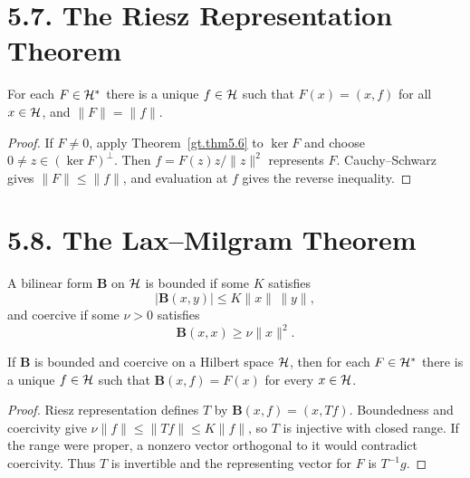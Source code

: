 \section*{5.7. The Riesz Representation Theorem}

\begin{theorem}\label{gt.thm5.7}

For each $F\in\mathcal{H}^*$ there is a unique $f\in\mathcal{H}$ such that
$F(x)=(x,f)$ for all $x\in\mathcal{H}$, and $\|F\|=\|f\|$.
\end{theorem}
\begin{proof}

\sketch If $F\neq0$, apply Theorem~\ref{gt.thm5.6} to $\ker F$ and choose
$0\neq z\in(\ker F)^\perp$. Then
$f=F(z)z/\|z\|^2$ represents $F$. Cauchy--Schwarz gives
$\|F\|\leq\|f\|$, and evaluation at $f$ gives the reverse inequality.
\end{proof}

\section*{5.8. The Lax--Milgram Theorem}

\begin{definition}\label{gt.def5.8.bilinear}

A bilinear form $\mathbf B$ on $\mathcal{H}$ is bounded if some $K$ satisfies
\begin{equation}\label{gt.eq5.10}
|\mathbf B(x,y)|\leq K\|x\|\,\|y\|,
\end{equation}
and coercive if some $\nu>0$ satisfies
\begin{equation}\label{gt.eq5.11}
\mathbf B(x,x)\geq\nu\|x\|^2.
\end{equation}
\end{definition}

\begin{theorem}\label{gt.thm5.8}

If $\mathbf B$ is bounded and coercive on a Hilbert space $\mathcal{H}$, then for
each $F\in\mathcal{H}^*$ there is a unique $f\in\mathcal{H}$ such that
$\mathbf B(x,f)=F(x)$ for every $x\in\mathcal{H}$.
\end{theorem}
\begin{proof}

\sketch Riesz representation defines $T$ by
$\mathbf B(x,f)=(x,Tf)$. Boundedness and coercivity give
$\nu\|f\|\leq\|Tf\|\leq K\|f\|$, so $T$ is injective with closed range.
If the range were proper, a nonzero vector orthogonal to it would contradict
coercivity. Thus $T$ is invertible and the representing vector for $F$ is
$T^{-1}g$.
\end{proof}

